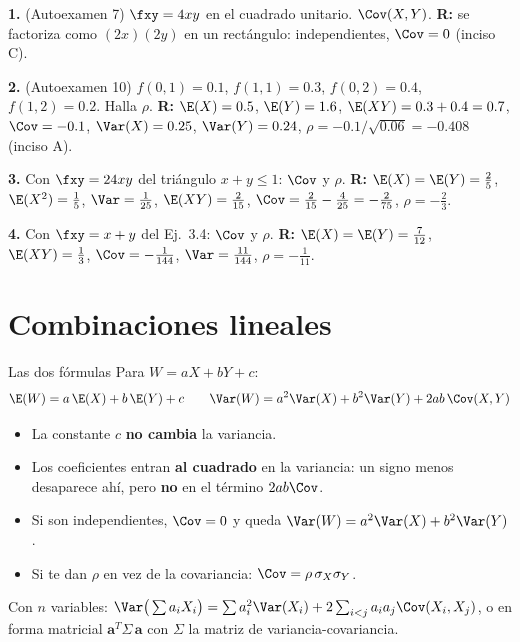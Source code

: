 \begin{mecaniza}
\textbf{1.} (Autoexamen 7) $\fxy=4xy$ en el cuadrado unitario. $\Cov(X,Y)$.
\quad\textbf{R:} se factoriza como $(2x)(2y)$ en un rect\'angulo: independientes, $\Cov=0$ (inciso C).

\textbf{2.} (Autoexamen 10) $f(0,1)=0.1$, $f(1,1)=0.3$, $f(0,2)=0.4$, $f(1,2)=0.2$. Halla $\rho$.
\quad\textbf{R:} $\E(X)=0.5$, $\E(Y)=1.6$, $\E(XY)=0.3+0.4=0.7$, $\Cov=-0.1$, $\Var(X)=0.25$, $\Var(Y)=0.24$,
$\rho=-0.1/\sqrt{0.06}=-0.408$ (inciso A).

\textbf{3.} Con $\fxy=24xy$ del tri\'angulo $x+y\le1$: $\Cov$ y $\rho$.
\quad\textbf{R:} $\E(X)=\E(Y)=\tfrac25$, $\E(X^2)=\tfrac15$, $\Var=\tfrac1{25}$, $\E(XY)=\tfrac2{15}$,
$\Cov=\tfrac2{15}-\tfrac4{25}=-\tfrac2{75}$, $\rho=-\tfrac23$.

\textbf{4.} Con $\fxy=x+y$ del Ej.~3.4: $\Cov$ y $\rho$.
\quad\textbf{R:} $\E(X)=\E(Y)=\tfrac7{12}$, $\E(XY)=\tfrac13$, $\Cov=-\tfrac1{144}$, $\Var=\tfrac{11}{144}$, $\rho=-\tfrac1{11}$.
\end{mecaniza}

\section{Combinaciones lineales}

\begin{teoria}{Las dos f\'ormulas}
Para $W=aX+bY+c$:
\[
\E(W)=a\,\E(X)+b\,\E(Y)+c
\qquad
\Var(W)=a^2\Var(X)+b^2\Var(Y)+2ab\,\Cov(X,Y)
\]
\begin{itemize}
\item La constante $c$ \textbf{no cambia} la variancia.
\item Los coeficientes entran \textbf{al cuadrado} en la variancia: un signo menos desaparece ah\'i, pero \textbf{no} en el t\'ermino $2ab\Cov$.
\item Si son independientes, $\Cov=0$ y queda $\Var(W)=a^2\Var(X)+b^2\Var(Y)$.
\item Si te dan $\rho$ en vez de la covariancia: $\Cov=\rho\,\sigma_X\sigma_Y$.
\end{itemize}
Con $n$ variables: $\Var\big(\sum a_iX_i\big)=\sum a_i^2\Var(X_i)+2\sum_{i<j}a_ia_j\Cov(X_i,X_j)$, o en forma matricial
$\mathbf a^{T}\Sigma\,\mathbf a$ con $\Sigma$ la matriz de variancia-covariancia.
\end{teoria}

